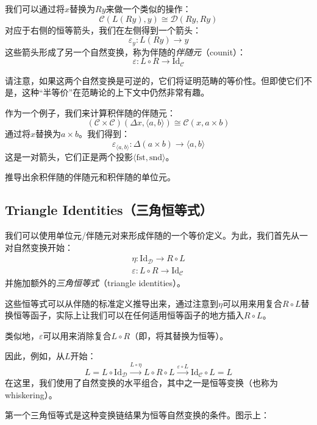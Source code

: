 \documentclass[DaoFP]{subfiles}
\begin{document}
    我们可以通过将$x$替换为$R y$来做一个类似的操作：
    \[  \mathcal{C} (L (R y), y) \cong \mathcal{D}( R y , R y)\]
    对应于右侧的恒等箭头，我们在左侧得到一个箭头：
    \[ \varepsilon_y \colon L (R y) \to y \]
    这些箭头形成了另一个自然变换，称为伴随的\emph{伴随元}（counit）：
    \[ \varepsilon \colon L \circ R \to \text{Id}_{\mathcal{C}}  \]

    请注意，如果这两个自然变换是可逆的，它们将证明范畴的等价性。但即使它们不是，这种“半等价”在范畴论的上下文中仍然非常有趣。

    作为一个例子，我们来计算积伴随的伴随元：
    \[  (\mathcal{C} \times \mathcal{C})( \Delta x,  \langle a, b \rangle ) \cong  \mathcal{C} (x, a \times b)  \]
    通过将$x$替换为$a \times b$。我们得到：
    \[ \varepsilon_{\langle a, b \rangle} \colon \Delta (a \times b) \to \langle a, b \rangle \]
    这是一对箭头，它们正是两个投影$\langle \text{fst}, \text{snd} \rangle$。

    \begin{exercise}
        推导出余积伴随的伴随元和积伴随的单位元。
    \end{exercise}

    \subsection{Triangle Identities（三角恒等式）}

    我们可以使用单位元/伴随元对来形成伴随的一个等价定义。为此，我们首先从一对自然变换开始：
    \begin{align*}
        \eta \colon \text{Id}_{\mathcal{D}} \to R \circ L \\
        \varepsilon \colon L \circ R \to \text{Id}_{\mathcal{C}}
    \end{align*}
    并施加额外的\emph{三角恒等式}（triangle identities）。

    这些恒等式可以从伴随的标准定义推导出来，通过注意到$\eta$可以用来用复合$R \circ L$替换恒等函子，实际上让我们可以在任何适用恒等函子的地方插入$R \circ L$。

    类似地，$\varepsilon$可以用来消除复合$L \circ R$（即，将其替换为恒等）。

    因此，例如，从$L$开始：
    \[ L = L \circ \text{Id}_{\mathcal{D}} \xrightarrow{L \circ \eta} L \circ R \circ L \xrightarrow{\varepsilon \circ L} \text{Id}_{\mathcal{C}} \circ L = L \]
    在这里，我们使用了自然变换的水平组合，其中之一是恒等变换（也称为whiskering）。

    第一个三角恒等式是这种变换链结果为恒等自然变换的条件。图示上：
\end{document}
